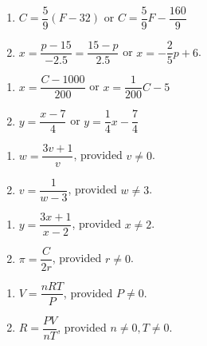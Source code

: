 \documentclass[11pt]{article}
\theoremstyle{definition}  %
\newcounter{HW}
\begin{document}
\begin{multicols}{2}
\begin{enumerate}
\setcounter{enumi}{\value{HW}}
\item  $C = \dfrac{5}{9}(F - 32)$ or  $C = \dfrac{5}{9} F - \dfrac{160}{9}$
\item  $x = \dfrac{p - 15}{-2.5} = \dfrac{15-p}{2.5}$ or $x = -\dfrac{2}{5} p + 6$.
\setcounter{HW}{\value{enumi}}
\end{enumerate}
\end{multicols}

\begin{multicols}{2}
\begin{enumerate}
\setcounter{enumi}{\value{HW}}
\item  $x = \dfrac{C - 1000}{200}$ or $x = \dfrac{1}{200} C - 5$
\item  $y = \dfrac{x-7}{4}$ or $y = \dfrac{1}{4} x - \dfrac{7}{4}$
\setcounter{HW}{\value{enumi}}
\end{enumerate}
\end{multicols}


\begin{multicols}{2}
\begin{enumerate}
\setcounter{enumi}{\value{HW}}
\item  $w = \dfrac{3v+1}{v}$, provided $v \neq 0$.
\item  $v = \dfrac{1}{w-3}$, provided $w \neq 3$.
\setcounter{HW}{\value{enumi}}
\end{enumerate}
\end{multicols}

\begin{multicols}{2}
\begin{enumerate}
\setcounter{enumi}{\value{HW}}
\item $y = \dfrac{3x+1}{x-2}$, provided $x \neq 2$.
\item $\pi = \dfrac{C}{2r}$, provided $r \neq 0$.


\setcounter{HW}{\value{enumi}}
\end{enumerate}
\end{multicols}


\begin{multicols}{2}
\begin{enumerate}
\setcounter{enumi}{\value{HW}}
\item $V = \dfrac{nRT}{P}$, provided $P \neq 0$.
\item $R = \dfrac{PV}{nT}$, provided $n \neq 0, T \neq 0$.
\setcounter{HW}{\value{enumi}}
\end{enumerate}
\end{multicols}
\end{document}
